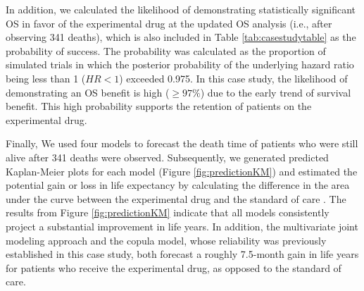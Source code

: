 \documentclass[aoas]{imsart}
\theoremstyle{plain}
\theoremstyle{remark}
\begin{document}
In addition, we calculated the likelihood of demonstrating statistically significant OS in favor of the experimental drug at the updated OS analysis (i.e., after observing 341 deaths), which is also included in Table \ref{tab:casestudytable} as the probability of success. The probability was calculated as the proportion of simulated trials in which the posterior probability of the underlying hazard ratio being less than 1 ($HR < 1$) exceeded 0.975. In this case study, the likelihood of demonstrating an OS benefit is high ($\geq 97\%$) due to the early trend of survival benefit. This high probability supports the retention of patients on the experimental drug.

Finally, We used four models to forecast the death time of patients who were still alive after 341 deaths were observed. Subsequently, we generated predicted Kaplan-Meier plots for each model (Figure \ref{fig:predictionKM}) and estimated the potential gain or loss in life expectancy by calculating the difference in the area under the curve between the experimental drug and the standard of care \citep{pak2017interpretability, survRM2}. The results from Figure \ref{fig:predictionKM} indicate that all models consistently project a substantial improvement in life years. In addition, the multivariate joint modeling approach and the copula model, whose reliability was previously established in this case study, both forecast a roughly 7.5-month gain in life years for patients who receive the experimental drug, as opposed to the standard of care.
\end{document}
